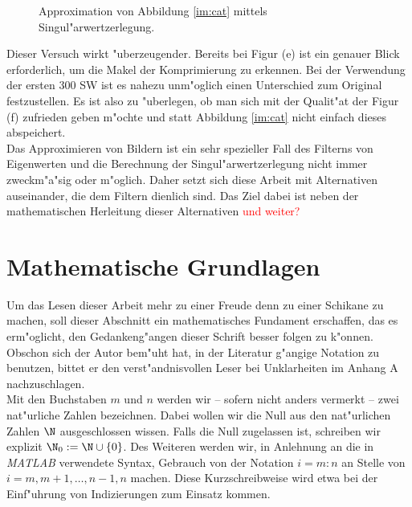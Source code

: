 \begin{figure}[h!]
\caption{Approximation von Abbildung \ref{im:cat} mittels Singul"arwertzerlegung.}
\end{figure}

Dieser Versuch wirkt "uberzeugender. Bereits bei Figur (e) ist ein genauer Blick erforderlich, um die Makel der Komprimierung zu erkennen.
Bei der Verwendung der ersten 300 SW ist es nahezu unm"oglich einen Unterschied zum Original festzustellen.
Es ist also zu "uberlegen, ob man sich mit der Qualit"at der Figur (f) zufrieden geben m"ochte und statt Abbildung \ref{im:cat} nicht einfach dieses abspeichert.\\

Das Approximieren von Bildern ist ein sehr spezieller Fall des Filterns von Eigenwerten und die Berechnung der Singul"arwertzerlegung nicht immer zweckm"a"sig oder m"oglich.
Daher setzt sich diese Arbeit mit Alternativen auseinander, die dem Filtern dienlich sind. Das Ziel dabei ist neben der mathematischen Herleitung dieser Alternativen \textcolor{red}{und weiter?}%


\section{Mathematische Grundlagen}

Um das Lesen dieser Arbeit mehr zu einer Freude denn zu einer Schikane zu
machen, soll dieser Abschnitt ein mathematisches Fundament erschaffen, das es erm"oglicht, den Gedankeng"angen dieser Schrift besser folgen zu k"onnen.
Obschon sich der Autor bem"uht hat,
in der Literatur g"angige Notation zu benutzen, bittet er den
verst"andnisvollen Leser bei Unklarheiten im Anhang A nachzuschlagen.\\

Mit den Buchstaben $m$ und $n$ werden wir -- sofern nicht anders vermerkt -- zwei nat"urliche Zahlen bezeichnen. Dabei wollen wir die Null aus den nat"urlichen Zahlen $\N$ ausgeschlossen wissen.
Falls die Null zugelassen ist, schreiben wir explizit $\N_0 := \N\cup\{0\}$. Des Weiteren werden wir,
in Anlehnung an die in \emph{MATLAB} verwendete Syntax, Gebrauch von der Notation $i=m:n$ an Stelle von $i=m,m+1,\ldots,n-1,n$ machen.
Diese Kurzschreibweise wird etwa bei der Einf"uhrung von Indizierungen zum Einsatz kommen.\\

